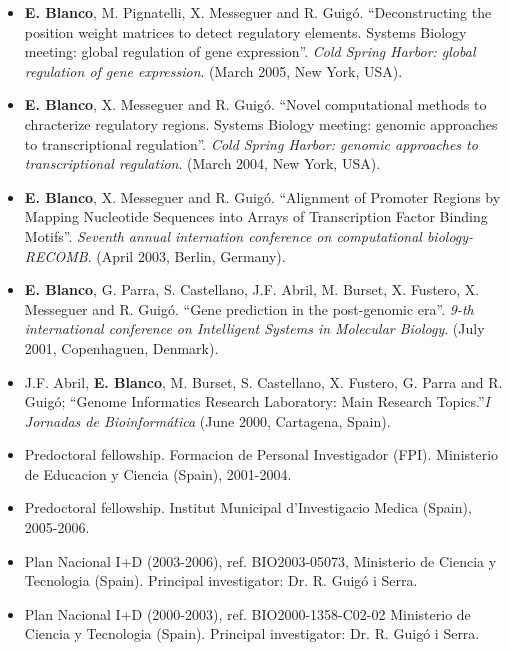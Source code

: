\vspace{0.5cm}
\begin{itemize}
\item
\textbf{E. Blanco}, M. Pignatelli, X. Messeguer and R. Guig\'{o}. 
``Deconstructing the position weight matrices to detect regulatory elements. Systems Biology meeting: global regulation of gene expression''. \emph{Cold Spring Harbor: global regulation of gene expression}. (March 2005, New York, USA). 

\item
\textbf{E. Blanco}, X. Messeguer and R. Guig\'{o}. 
``Novel computational methods to chracterize regulatory regions. Systems Biology meeting: genomic approaches to transcriptional regulation''. \emph{Cold Spring Harbor: genomic approaches to transcriptional regulation}. (March 2004, New York, USA). 

\item
\textbf{E. Blanco}, X. Messeguer and R. Guig\'{o}. 
``Alignment of Promoter Regions by Mapping Nucleotide Sequences into Arrays of Transcription 
Factor Binding Motifs''. \emph{Seventh annual internation conference on computational biology-RECOMB}. (April 2003, Berlin, Germany).

\item
\textbf{E. Blanco}, G. Parra, S. Castellano, J.F. Abril, M. Burset, X. Fustero, X. Messeguer 
and R. Guig\'{o}. ``Gene prediction in the post-genomic era''. \emph{9-th international conference on Intelligent Systems in Molecular Biology}. (July 2001, Copenhaguen, Denmark).

\item J.F. Abril, \textbf{E. Blanco}, M. Burset, S. Castellano, X. Fustero,  G. Parra and  R. Guig\'o; ``Genome Informatics Research Laboratory: Main Research Topics.''{\it I Jornadas de 
Bioinform\'atica} (June 2000, Cartagena, Spain). 
\end{itemize}

\vspace{0.5cm}
\begin{itemize}
\item
Predoctoral fellowship. Formacion de Personal Investigador (FPI). Ministerio de Educacion y 
Ciencia (Spain), 2001-2004.
\item
Predoctoral fellowship. Institut Municipal d'Investigacio Medica (Spain), 2005-2006.
\end{itemize}

\vspace{0.5cm}
\begin{itemize}
\item
Plan Nacional I+D (2003-2006), ref. BIO2003-05073, Ministerio de Ciencia
y Tecnologia (Spain). Principal investigator: Dr. R. Guig\'o i Serra.
\item
Plan Nacional I+D (2000-2003), ref. BIO2000-1358-C02-02 Ministerio de Ciencia
y Tecnologia (Spain). Principal investigator: Dr. R. Guig\'o i Serra.
\end{itemize}

